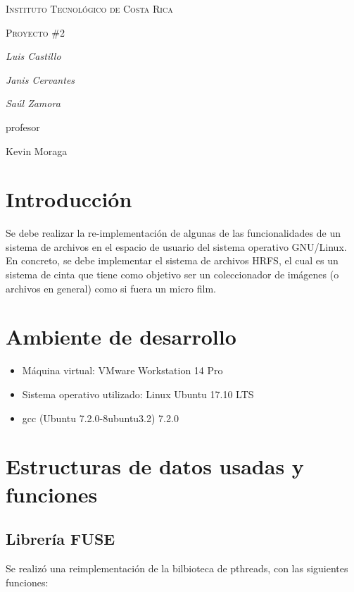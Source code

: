 \documentclass{article}
\begin{document}
\begin{titlepage}
  \centering
  {\scshape\LARGE Instituto Tecnol\'ogico de Costa Rica \par}
  \vspace{1cm}
  {\scshape\Large Proyecto \#2\par}
  \vspace{1.5cm}
  {\Large\itshape Luis Castillo\par}
  {\Large\itshape Janis Cervantes\par}
  {\Large\itshape Sa\'ul Zamora\par}
  \vfill
  profesor\par
  Kevin Moraga \textsc{}

  \vfill

\end{titlepage}

\section{Introducci\'on}
Se debe realizar la re-implementaci\'on de algunas de las funcionalidades de un sistema de archivos en el espacio de usuario del sistema operativo GNU/Linux. En concreto, se debe implementar el sistema de archivos HRFS, el cual es un sistema de cinta que tiene como objetivo ser un coleccionador de im\'agenes (o archivos en general) como si fuera un micro film.

\section{Ambiente de desarrollo}
\begin{itemize}
  \item M\'aquina virtual: VMware Workstation 14 Pro
  \item Sistema operativo utilizado: Linux Ubuntu 17.10 LTS
  \item gcc (Ubuntu 7.2.0-8ubuntu3.2) 7.2.0
\end{itemize}

\section{Estructuras de datos usadas y funciones}
\subsection{Librer\'ia FUSE}
Se realiz\'o una reimplementaci\'on de la bilbioteca de pthreads, con las siguientes funciones:
\end{document}
